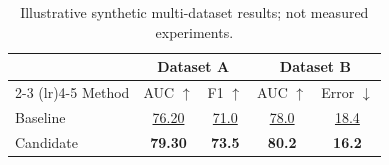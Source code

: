 \documentclass[10pt]{article}
\begin{document}
\begin{table}[t]
\centering
\caption{Illustrative synthetic multi-dataset results; not measured experiments.}
\label{tab:multi-dataset}
\begin{tabular}{@{}lcccc@{}}
\toprule
 & \multicolumn{2}{c}{Dataset A} & \multicolumn{2}{c}{Dataset B} \\
\cmidrule(lr){2-3} \cmidrule(lr){4-5}
Method & AUC $\uparrow$ & F1 $\uparrow$ & AUC $\uparrow$ & Error $\downarrow$ \\
\midrule
Baseline & \underline{76.20} & \underline{71.0} & \underline{78.0} & \underline{18.4} \\
Candidate & \textbf{79.30} & \textbf{73.5} & \textbf{80.2} & \textbf{16.2} \\
\bottomrule
\end{tabular}
\end{table}
\end{document}
